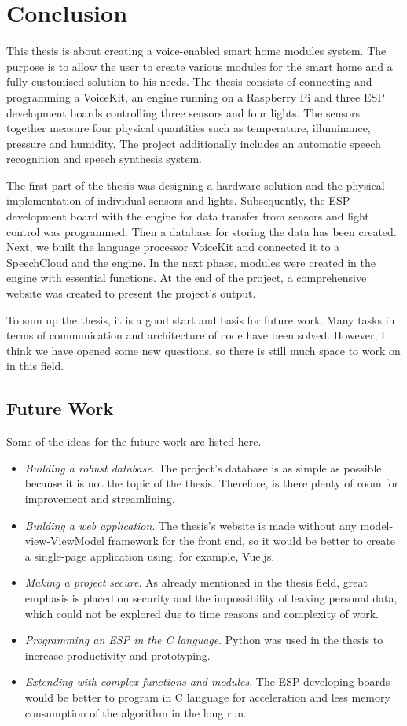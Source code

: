\chapter{Conclusion} \label{chap:conclusion}
This thesis is about creating a voice-enabled smart home modules system. The purpose is to allow the user to create various modules for the smart home and a fully customised solution to his needs. The thesis consists of connecting and programming a VoiceKit, an engine running on a Raspberry Pi and three ESP development boards controlling three sensors and four lights. The sensors together measure four physical quantities such as temperature, illuminance, pressure and humidity. The project additionally includes an automatic speech recognition and speech synthesis system. 

The first part of the thesis was designing a hardware solution and the physical implementation of individual sensors and lights. Subsequently, the ESP development board with the engine for data transfer from sensors and light control was programmed. Then a database for storing the data has been created. Next, we built the language processor VoiceKit and connected it to a SpeechCloud and the engine. In the next phase, modules were created in the engine with essential functions. At the end of the project, a comprehensive website was created to present the project's output. 

To sum up the thesis, it is a good start and basis for future work. Many tasks in terms of communication and architecture of code have been solved. However, I think we have opened some new questions, so there is still much space to work on in this field. 

\section{Future Work} \label{sec:future_work}
Some of the ideas for the future work are listed here.

\begin{itemize}
    \item \textit{Building a robust database}. The project's database is as simple as possible because it is not the topic of the thesis. Therefore, is there plenty of room for improvement and streamlining.
    \item \textit{Building a web application}. The thesis's website is made without any model-view-ViewModel framework for the front end, so it would be better to create a single-page application using, for example, Vue.js.
    \item \textit{Making a project secure}. As already mentioned in the thesis field, great emphasis is placed on security and the impossibility of leaking personal data, which could not be explored due to time reasons and complexity of work.
    \item \textit{Programming an ESP in the C language}. Python was used in the thesis to increase productivity and prototyping.
    \item \textit{Extending with complex functions and modules}. The ESP developing boards would be better to program in C language for acceleration and less memory consumption of the algorithm in the long run.
\end{itemize}
